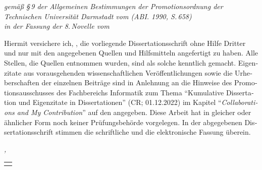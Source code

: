 
\begin{otherlanguage}{ngerman}



\begin{flushright}
    \emph{\small gemäß §\,9 der Allgemeinen Bestimmungen der Promotionsordnung der \\
    Technischen Universität Darmstadt vom  (ABI. 1990, S.\,658) \\
    in der Fassung der 8.\,Novelle vom }
\end{flushright}
Hiermit versichere ich, \myName{}, die vorliegende Dissertationsschrift ohne Hilfe Dritter und nur mit den angegebenen Quellen und Hilfsmitteln angefertigt zu haben. Alle Stellen, die Quellen entnommen wurden, sind als solche kenntlich gemacht. Eigenzitate aus vorausgehenden wissenschaftlichen Veröffentlichungen sowie die Urheberschaften der einzelnen Beiträge sind in Anlehnung an die Hinweise des Promotionsausschusses des Fachbereichs Informatik zum Thema \enquote{Kumulative Dissertation und Eigenzitate in Dissertationen} (CR; 01.12.2022) im Kapitel \enquote{\emph{Collaborations and My Contribution}} auf den  angegeben. Diese Arbeit hat in gleicher oder ähnlicher Form noch keiner Prüfungsbehörde vorgelegen. In der abgegebenen Dissertationsschrift stimmen die schriftliche und die elektronische Fassung überein.

\bigskip

\noindent\textit{\myLocation{}, \myTime{}}

\begin{flushright}
    \begin{tabular}{m{5cm}}
        \\ \hline
        \centering\myName{} \\
    \end{tabular}
\end{flushright}

\end{otherlanguage}
